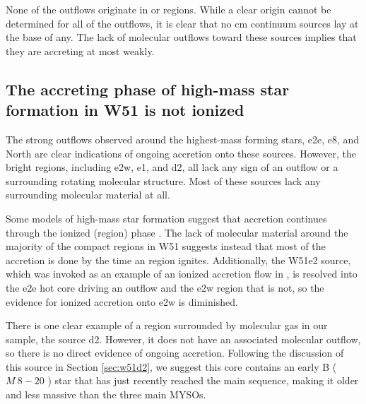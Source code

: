 \documentclass[twocolumn]{aastex61}
\begin{document}
None of the outflows originate in \uchii or \hchii regions.  While a clear
origin cannot be determined for all of the outflows, it is clear that no cm
continuum sources lay at the base of any.  The lack of molecular outflows
toward these sources implies that they are accreting at most weakly.
% 

\subsection{The accreting phase of high-mass star formation in W51 is not ionized}
\label{sec:accretionandoutflows}
The strong outflows observed around the highest-mass forming stars, e2e, e8,
and North are clear indications of ongoing accretion onto these sources.
However, the bright \hii regions, including e2w, e1, and d2, all lack any sign
of an outflow or a surrounding rotating molecular structure.  Most of these
sources lack any surrounding molecular material at all.

Some models of high-mass star formation suggest that accretion continues
through the ionized (\hii region) phase \citep{Keto2002b,Keto2003a}.  The lack
of molecular material around the majority of the compact \hii regions in W51
suggests instead that most of the accretion is done by the time an \hii region
ignites.  Additionally, the W51e2 source, which was invoked as an example of an
ionized accretion flow in \citet{Keto2008a}, is  resolved into the e2e
hot core driving an outflow and the e2w \hchii region that is not, so the
evidence for ionized accretion onto e2w is diminished.

There is one clear example of a \hchii region surrounded by molecular gas in
our sample, the source d2.  However, it does not have an associated molecular
outflow, so there is no direct evidence of ongoing accretion.
Following the discussion of this source in Section \ref{sec:w51d2}, we suggest
this core contains an early B ($M~8-20$ \msun) star that has just recently
reached the main sequence, making it older and less massive than the three main
MYSOs.

% 
\end{document}

